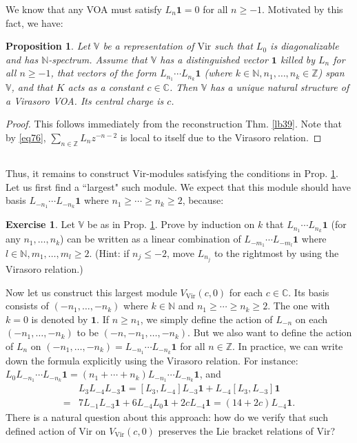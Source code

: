 \documentclass[11pt,b5paper,notitlepage]{article}
\theoremstyle{definition}
\newtheorem{exe}[df]{Exercise}
\theoremstyle{plain}
\newtheorem{pp}[df]{Proposition}
\newcommand{\id}{\mathbf{1}}
\newcommand{\Vir}{\mathrm{Vir}}
\newcommand{\Vbb}{\mathbb V}
\newcommand{\Cbb}{\mathbb C}
\newcommand{\Nbb}{\mathbb N}
\newcommand{\Zbb}{\mathbb Z}
\numberwithin{equation}{section}
\begin{document}
We know that any VOA must satisfy $L_n\id=0$ for all $n\geq-1$. Motivated by this fact, we have:
\begin{pp}\label{lb45}
Let $\Vbb$ be a representation of $\Vir$ such that $L_0$ is diagonalizable and has $\Nbb$-spectrum. Assume that $\Vbb$ has a distinguished vector $\id$ killed by $L_n$ for all $n\geq -1$,  that vectors of the form $L_{n_1}\cdots L_{n_k}\id$ (where $k\in\Nbb,n_1,\dots,n_k\in\Zbb$) span $\Vbb$, and that $K$ acts as a constant $c\in\Cbb$. Then $\Vbb$ has a unique natural structure of a Virasoro VOA. Its central charge is $c$.
\end{pp} 

\begin{proof}
This follows immediately from the reconstruction Thm. \ref{lb39}. Note that by \eqref{eq76}, $\sum_{n\in\Zbb}L_nz^{-n-2}$ is local to itself due to the Virasoro relation.
\end{proof}

\subsection{}


Thus, it remains to construct $\Vir$-modules satisfying the conditions in Prop. \ref{lb45}. Let us first find a ``largest" such module. We expect that this module should have basis $L_{-n_1}\cdots L_{-n_k}\id$ where $n_1\geq\cdots\geq n_k\geq 2$,  because:
\begin{exe}
Let $\Vbb$ be as in Prop. \ref{lb45}. Prove by induction on $k$ that $L_{n_1}\cdots L_{n_k}\id$ (for any $n_1,\dots,n_k$) can be written as a linear combination of $L_{-m_1}\cdots L_{-m_l}\id$ where $l\in\Nbb,m_1,\dots,m_l\geq2$. (Hint: if $n_j\leq -2$, move $L_{n_j}$ to the rightmost by using the Virasoro relation.)
\end{exe}

Now let us construct this largest module $V_\Vir(c,0)$ for each $c\in\Cbb$. Its basis consists of $(-n_1,\dots,-n_k)$ where $k\in\Nbb$ and $n_1\geq \cdots\geq n_k\geq2$. The one with $k=0$ is denoted by $\id$. If $n\geq n_1$, we simply define the action of $L_{-n}$ on each $(-n_1,\dots,-n_k)$ to be $(-n,-n_1,\dots,-n_k)$. But we also want to define the action of $L_n$ on $(-n_1,\dots,-n_k)=L_{-n_1}\cdots L_{-n_k}\id$ for all $n\in\Zbb$. In practice, we can write down the formula explicitly using the Virasoro relation. For instance: $L_0L_{-n_1}\cdots L_{-n_k}\id=(n_1+\cdots+n_k)L_{-n_1}\cdots L_{-n_k}\id$, and
\begin{align}
&L_3L_{-4}L_{-3}\id=[L_3,L_{-4}]L_{-3}\id+L_{-4}[L_3,L_{-3}]\id\nonumber\\
=&7L_{-1}L_{-3}\id+6L_{-4}L_0\id+2cL_{-4}\id=(14+2c)L_{-4}\id.\label{eq72}
\end{align}
There is a natural question about this approach: how do we verify that such defined action of $\Vir$ on $V_\Vir(c,0)$ preserves the Lie bracket relations of $\Vir$?
\end{document}
